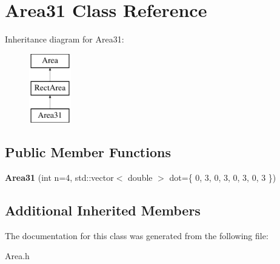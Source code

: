 \hypertarget{class_area31}{}\section{Area31 Class Reference}
\label{class_area31}
Inheritance diagram for Area31\+:\begin{figure}[H]
\begin{center}
\leavevmode
\includegraphics[height=3.000000cm]{class_area31}
\end{center}
\end{figure}
\subsection*{Public Member Functions}
\begin{DoxyCompactItemize}
\item 
\mbox{\label{class_area31_a9fe381a6d26ff98208c41e474861509a}} 
{\bfseries Area31} (int n=4, std\+::vector$<$ double $>$ dot=\{ 0, 3, 0, 3, 0, 3, 0, 3 \})
\end{DoxyCompactItemize}
\subsection*{Additional Inherited Members}


The documentation for this class was generated from the following file\+:\begin{DoxyCompactItemize}
\item 
Area.\+h\end{DoxyCompactItemize}
